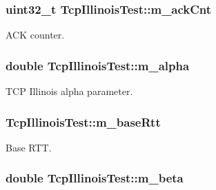 \subsubsection[{\texorpdfstring{m\+\_\+ack\+Cnt}{m_ackCnt}}]{\setlength{\rightskip}{0pt plus 5cm}uint32\+\_\+t Tcp\+Illinois\+Test\+::m\+\_\+ack\+Cnt\hspace{0.3cm}{\ttfamily [private]}}\hypertarget{classTcpIllinoisTest_a4683d4ed2bd3ec0b78e89ba8677fbcac}{}\label{classTcpIllinoisTest_a4683d4ed2bd3ec0b78e89ba8677fbcac}


A\+CK counter. 

\subsubsection[{\texorpdfstring{m\+\_\+alpha}{m_alpha}}]{\setlength{\rightskip}{0pt plus 5cm}double Tcp\+Illinois\+Test\+::m\+\_\+alpha\hspace{0.3cm}{\ttfamily [private]}}\hypertarget{classTcpIllinoisTest_ad2a9a93f32ddcb3183cdb1168435e82d}{}\label{classTcpIllinoisTest_ad2a9a93f32ddcb3183cdb1168435e82d}


T\+CP Illinois alpha parameter. 

\subsubsection[{\texorpdfstring{m\+\_\+base\+Rtt}{m_baseRtt}}]{ Tcp\+Illinois\+Test\+::m\+\_\+base\+Rtt\hspace{0.3cm}{\ttfamily [private]}}\hypertarget{classTcpIllinoisTest_a4546c5096f2a83762e18900674060716}{}\label{classTcpIllinoisTest_a4546c5096f2a83762e18900674060716}


Base R\+TT. 

\subsubsection[{\texorpdfstring{m\+\_\+beta}{m_beta}}]{\setlength{\rightskip}{0pt plus 5cm}double Tcp\+Illinois\+Test\+::m\+\_\+beta\hspace{0.3cm}{\ttfamily [private]}}\hypertarget{classTcpIllinoisTest_ade2dbf31d984e382cf76a2403b79e46e}{}\label{classTcpIllinoisTest_ade2dbf31d984e382cf76a2403b79e46e}


